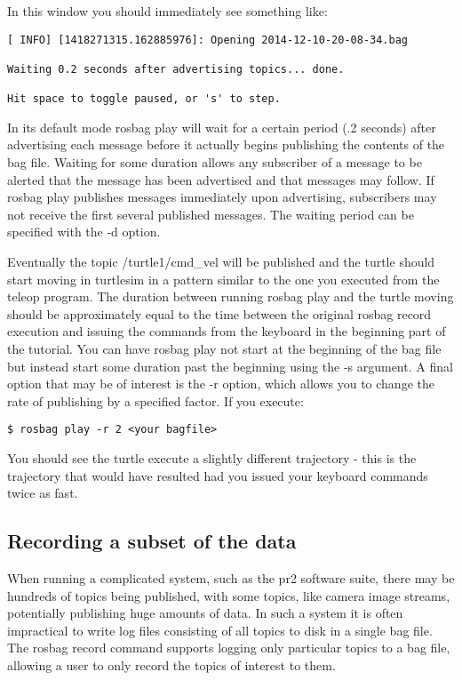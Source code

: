 In this window you should immediately see something like:

\begin{lstlisting}[breaklines=true languages=bash]
[ INFO] [1418271315.162885976]: Opening 2014-12-10-20-08-34.bag

Waiting 0.2 seconds after advertising topics... done.

Hit space to toggle paused, or 's' to step.
\end{lstlisting}

In its default mode rosbag play will wait for a certain period (.2 seconds) after advertising each message before it actually begins publishing the contents of the bag file. Waiting for some duration allows any subscriber of a message to be alerted that the message has been advertised and that messages may follow. If rosbag play publishes messages immediately upon advertising, subscribers may not receive the first several published messages. The waiting period can be specified with the -d option.

Eventually the topic /turtle1/cmd\_vel will be published and the turtle should start moving in turtlesim in a pattern similar to the one you executed from the teleop program. The duration between running rosbag play and the turtle moving should be approximately equal to the time between the original rosbag record execution and issuing the commands from the keyboard in the beginning part of the tutorial. You can have rosbag play not start at the beginning of the bag file but instead start some duration past the beginning using the -s argument. A final option that may be of interest is the -r option, which allows you to change the rate of publishing by a specified factor. If you execute:

\begin{lstlisting}[breaklines=true languages=bash]
$ rosbag play -r 2 <your bagfile>
\end{lstlisting}

You should see the turtle execute a slightly different trajectory - this is the trajectory that would have resulted had you issued your keyboard commands twice as fast.

\subsection{Recording a subset of the data}

When running a complicated system, such as the pr2 software suite, there may be hundreds of topics being published, with some topics, like camera image streams, potentially publishing huge amounts of data. In such a system it is often impractical to write log files consisting of all topics to disk in a single bag file. The rosbag record command supports logging only particular topics to a bag file, allowing a user to only record the topics of interest to them.

